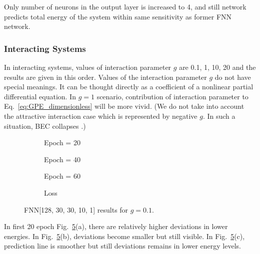 \documentclass[a4paper,times,12pt]{article}
\begin{document}
Only number of neurons in the output layer is increased to 4, and still network predicts total energy of the system within same sensitivity as former FNN network.


\subsubsection{Interacting Systems}

In interacting systems, values of interaction parameter $g$ are 0.1, 1, 10, 20 and the results are given in this order. Values of the interaction parameter $g$ do not have special meanings. It can be thought directly as a coefficient of a nonlinear partial differential equation. In $g =1$ scenario, contribution of interaction parameter to Eq.~\ref{eq:GPE_dimensionless} will be more vivid. (We do not take into account the attractive interaction case which is represented by negative $g$. In such a situation, BEC collapses \cite{barenghi2016primer}.)

\begin{figure}[H]
    \centering
    \begin{subfigure}[t]{0.45\textwidth}
		\centering
        
        \caption{Epoch = 20}
		\label{fig:a}
    \end{subfigure}
    \begin{subfigure}[t]{0.45\textwidth}
		\centering
        
        \caption{Epoch = 40}
		\label{fig:b}
    \end{subfigure}    
    \begin{subfigure}[t]{0.45\textwidth}
        \centering
        
        \caption{Epoch = 60}
		\label{fig:c}
    \end{subfigure}
    \begin{subfigure}[t]{0.45\textwidth}
        \centering
        
        \caption{Loss}
		\label{fig:c}
    \end{subfigure}
	\caption{FNN[128, 30, 30, 10, 1] results for $g = 0.1$.}
\label{fig:FFN-g-0.1}
\end{figure}

In first 20 epoch Fig.~\ref{fig:FFN-g-0.1}(a), there are relatively higher deviations in lower energies. In Fig.~\ref{fig:FFN-g-0.1}(b), deviations become smaller but still visible. In Fig.~\ref{fig:FFN-g-0.1}(c), prediction line is smoother but still deviations remains in lower energy levels.
\end{document}
